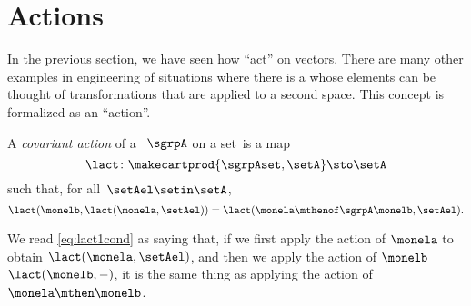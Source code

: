 
\section{Actions}
\label{sec:actions}
In the previous section, we have seen how  ``act'' on vectors.
There are many other examples in engineering of situations where there is a   whose elements can be thought of transformations that are applied to a second space.
This concept is formalized as an ``action''.

\begin{ctdefinition}
    \label{def:semigroup-cov-action-prelim}
    A \emph{covariant  action} of a ~$\sgrpA$ on a set~\setA is a map
    \begin{equation}
        \label{eq:lact}
        \lact \colon \makecartprod{\sgrpAset, \setA} \sto \setA
    \end{equation}
    such that, for all~$\setAel \setin \setA$,
    \begin{equation}
        \label{eq:lact1cond}
        \lact(\monelb, \lact(\monela, \setAel)) = \lact(\monela \mthenof\sgrpA \monelb, \setAel).
    \end{equation}
\end{ctdefinition}

We read \cref{eq:lact1cond} as saying that, if we first apply the action of $\monela$ to obtain $\lact(\monela, \setAel)$,
and then we apply the action of $\monelb$ $\lact(\monelb, -)$, it is the same thing as applying the action of $\monela\mthen\monelb$.


